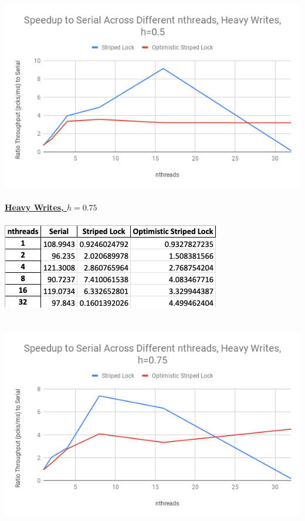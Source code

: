 \documentclass{article}
\begin{document}
\begin{adjustwidth}{-2cm}{-2cm}
\null\\
\includegraphics[width=\linewidth]{e3_45_5_graph.png}\\ \null\\
\underline{\textbf{Heavy Writes, $h=0.75$}}\\
\null\\
\includegraphics[width=\linewidth]{e3_45_75_data.png}\\ \null\\
\null\\
\includegraphics[width=\linewidth]{e3_45_75_graph.png}\\ \null\\

\end{adjustwidth}
\end{document}
